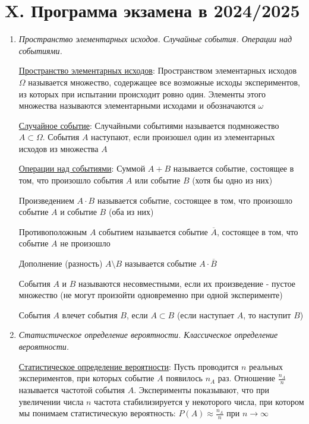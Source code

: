 \clearpage

\section{X. Программа экзамена в 2024/2025}

\begin{enumerate}
    \item \textit{Пространство элементарных исходов. Случайные события. Операции над событиями.}

    \hyperlink{spaceofelementaryoutcomes}{Пространство элементарных исходов}: Пространством элементарных исходов $\Omega$ называется множество, содержащее все возможные исходы
    экспериментов, из которых при испытании происходит ровно один. Элементы этого множества называются
    элементарными исходами и обозначаются $\omega$

    \hyperlink{randomeventdefinition}{Случайное событие}: Случайными событиями называется подмножество $A \subset \Omega$. События $A$ наступают, если произошел один из
    элементарных исходов из множества $A$

    \hyperlink{randomeventoperations}{Операции над событиями}: Суммой $A + B$ называется событие, состоящее в том, что произошло события $A$ или событие $B$ (хотя бы одно из них)

    Произведением $A \cdot B$ называется событие, состоящее в том, что произошло событие $A$ и событие $B$ (оба из них)

    Противоположным $A$ событием называется событие $\overline{A}$, состоящее в том, что событие $A$ не произошло

    Дополнение (разность) $A \setminus B$ называется событие $A \cdot \overline{B}$

    События $A$ и $B$ называются несовместными, если их произведение - пустое множество
    (не могут произойти одновременно при одной эксперименте)

    События $A$ влечет события $B$, если $A \subset B$ (если наступает $A$, то наступит $B$)

    \item \textit{Статистическое определение вероятности. Классическое определение вероятности.}

    \hyperlink{statisticaldefinitionofprobability}{Статистическое определение вероятности}: Пусть проводится $n$ реальных экспериментов, при которых событие $A$ появилось $n_A$ раз.
    Отношение $\frac{n_A}{n}$ называется частотой события $A$.
    Эксперименты показывают, что при увеличении числа $n$ частота стабилизируется у некоторого числа,
    при котором мы понимаем статистическую вероятность: $P(A) \approx \frac{n_A}{n}$ при $n \to \infty$


\end{enumerate}
